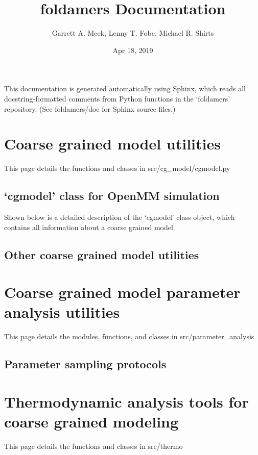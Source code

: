 \documentclass[letterpaper,10pt,english,openany,oneside]{sphinxmanual}
\title{foldamers Documentation}
\date{Apr 18, 2019}
\author{Garrett A. Meek, Lenny T. Fobe, Michael R. Shirts}
\begin{document}
\pagestyle{empty}
\maketitle
\pagestyle{plain}
\sphinxtableofcontents
\pagestyle{normal}
\label{\detokenize{index::doc}}


This documentation is generated automatically using Sphinx, which reads
all docstring-formatted comments from Python functions in
the ‘foldamers’ repository.  (See foldamers/doc for Sphinx
source files.)


\chapter{Coarse grained model utilities}
\label{\detokenize{cg_model:coarse-grained-model-utilities}}\label{\detokenize{cg_model::doc}}
This page details the functions and classes in src/cg\_model/cgmodel.py


\section{‘cgmodel’ class for OpenMM simulation}
\label{\detokenize{cg_model:cgmodel-class-for-openmm-simulation}}
Shown below is a detailed description of the ‘cgmodel’ class object,
which contains all information about a coarse grained model.


\section{Other coarse grained model utilities}
\label{\detokenize{cg_model:other-coarse-grained-model-utilities}}

\chapter{Coarse grained model parameter analysis utilities}
\label{\detokenize{parameter_analysis:coarse-grained-model-parameter-analysis-utilities}}\label{\detokenize{parameter_analysis::doc}}
This page details the modules, functions, and classes
in src/parameter\_analysis


\section{Parameter sampling protocols}
\label{\detokenize{parameter_analysis:parameter-sampling-protocols}}

\chapter{Thermodynamic analysis tools for coarse grained modeling}
\label{\detokenize{thermo:thermodynamic-analysis-tools-for-coarse-grained-modeling}}\label{\detokenize{thermo::doc}}
This page details the functions and classes in src/thermo
\end{document}
